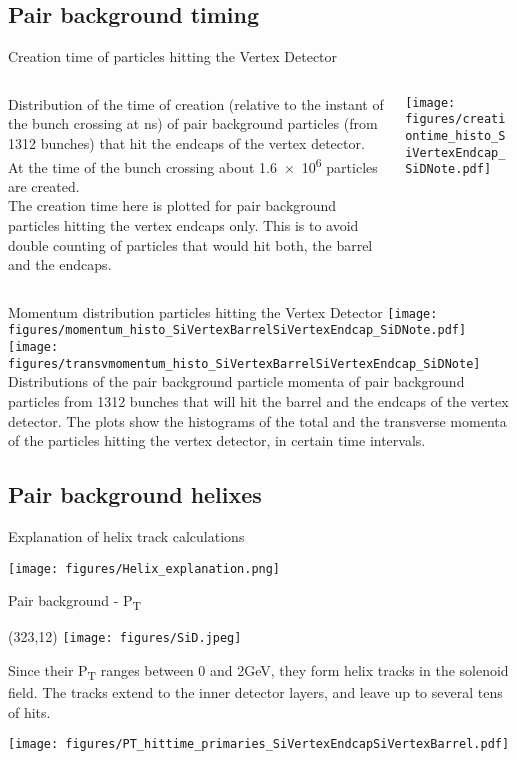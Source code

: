 \documentclass[xcolor={dvipsnames}]{beamer}
\newcommand{\sidlogo}{
  \setlength{\TPHorizModule}{1pt}
  \setlength{\TPVertModule}{1pt}
  \begin{textblock}{1}(323,12)
   \texttt{[image: figures/SiD.jpeg]}
  \end{textblock}
  }
\begin{document}
\subsection{Pair background timing}
\begin{frame}{Creation time of particles hitting the Vertex Detector}
\begin{columns}
 \begin{column}{0.4\textwidth}
Distribution of the time of creation (relative to the instant of the bunch crossing at \unit[0]{ns}) of pair background particles (from 1312 bunches) that hit the endcaps of the vertex detector.
At the time of the bunch crossing about \num{1.6e6} particles are created.\\
{\footnotesize The creation time here is plotted for pair background particles hitting the vertex endcaps only. This is to avoid double counting of particles that would hit both, the barrel and the endcaps.}
 \end{column}
 \begin{column}{0.6\textwidth}
 \texttt{[image: figures/creationtime\_histo\_SiVertexEndcap\_SiDNote.pdf]}
 \end{column}
\end{columns}
\end{frame}

\begin{frame}{Momentum distribution particles hitting the Vertex Detector}
  \texttt{[image: figures/momentum\_histo\_SiVertexBarrelSiVertexEndcap\_SiDNote.pdf]}
  \texttt{[image: figures/transvmomentum\_histo\_SiVertexBarrelSiVertexEndcap\_SiDNote]}\\
  Distributions of the pair background particle momenta of pair background particles from 1312 bunches that will hit the barrel and the endcaps of the vertex detector.
  The plots show the histograms of the total and the transverse momenta of the particles hitting the vertex detector, in certain time intervals.
\end{frame}

\subsection{Pair background helixes}
\begin{frame}{Explanation of helix track calculations}
 \begin{center}
  \texttt{[image: figures/Helix\_explanation.png]}
\end{center}
\end{frame}
\begin{frame}{Pair background -  P\textsubscript{T}}
\sidlogo
Since their P\textsubscript{T} ranges between 0 and 2GeV, they form helix tracks in the solenoid field. The tracks extend to the inner detector layers, and leave up to several tens of hits.
\begin{center}
\texttt{[image: figures/PT\_hittime\_primaries\_SiVertexEndcapSiVertexBarrel.pdf]}
\end{center}
\end{frame}
\end{document}
